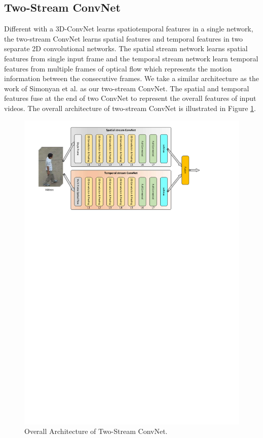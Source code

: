 \subsection{Two-Stream ConvNet}
\label{3_3_2}
Different with a 3D-ConvNet learns spatiotemporal features in a single network, the two-stream ConvNet learns spatial features and temporal features in two separate 2D convolutional networks. The spatial stream network learns spatial features from single input frame and the temporal stream network learn temporal features from multiple frames of optical flow which represents the motion information between the consecutive frames. We take a similar architecture as the work of Simonyan et al.\cite{simonyan2014} as our two-stream ConvNet. The spatial and temporal features fuse at the end of two ConvNet to represent the overall features of input videos. The overall architecture of two-stream ConvNet is illustrated in Figure \ref{fig:tsconvnet}.
\begin{figure}
	\includegraphics[trim=2cm 21cm 0cm 1cm]{fig01/TSConvNet.pdf}
	\caption{Overall Architecture of Two-Stream ConvNet. }
	\label{fig:tsconvnet}
\end{figure}

